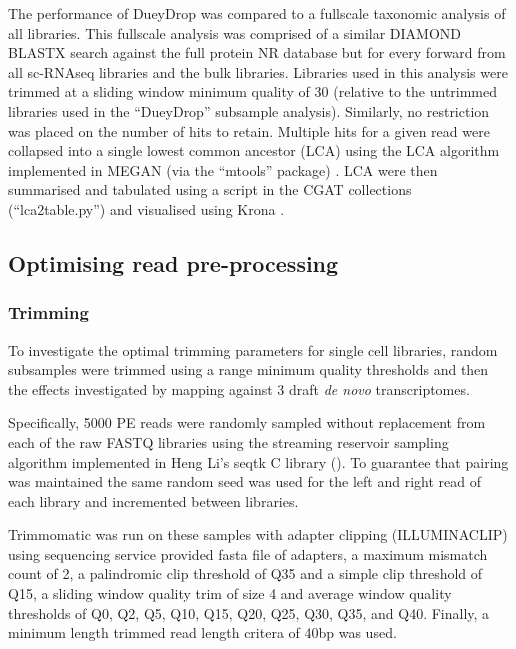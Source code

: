 The performance of DueyDrop was compared to a fullscale taxonomic analysis of all libraries.
This fullscale analysis was comprised of a similar DIAMOND BLASTX search against the full
protein NR database but for every forward from all sc-RNAseq libraries and the bulk libraries.
Libraries used in this analysis were trimmed at a sliding window minimum quality of 30 (relative to
the untrimmed libraries used in the ``DueyDrop'' subsample analysis). Similarly, no restriction
was placed on the number of hits to retain.  Multiple hits for a given read were collapsed 
into a single lowest common ancestor (LCA) using the LCA algorithm \citep{Gabow1985} implemented in MEGAN (via the ``mtools''
package) \citep{Huson2007,el2013improved}.  LCA were then summarised and tabulated using
a script in the CGAT collections (``lca2table.py'') \citep{Sims2014} and visualised 
using Krona \citep{Ondov2011}.


\subsection{Optimising read pre-processing}

\subsubsection{Trimming}

To investigate the optimal trimming parameters for single cell libraries, 
random subsamples were trimmed using a range minimum quality thresholds and then the effects investigated
by mapping against 3 draft \textit{de novo} transcriptomes.


Specifically, 5000 PE reads were randomly sampled without replacement from each of the raw FASTQ libraries 
using the streaming reservoir sampling \citep{Vitter1985} algorithm implemented in Heng Li's 
seqtk C library (\citep{SeqtkGitHub}).
To guarantee that pairing was maintained the same random seed was used for the left and right read
of each library and incremented between libraries.

Trimmomatic \citep{Bolger2014a} was run on these samples with adapter clipping (ILLUMINACLIP)
using sequencing service provided fasta file of adapters, a maximum mismatch count of 2,
a palindromic clip threshold of Q35 and a simple clip threshold of Q15, a sliding window
quality trim of size 4 and average window quality thresholds of Q0, Q2, Q5, Q10, Q15, Q20, Q25, Q30, Q35, and Q40.
Finally, a minimum length trimmed read length critera of 40bp was used.  


